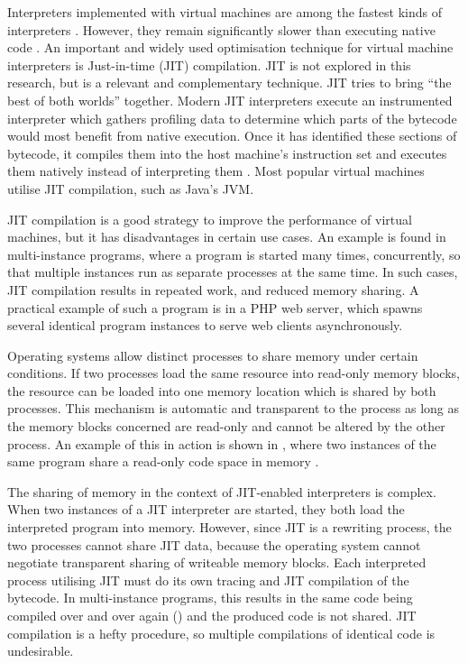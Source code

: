 		Interpreters implemented with virtual machines are among the fastest kinds of interpreters \citep{modernarchvm}. However, they remain significantly slower than executing native code \citep{optimizingindirectbranch}. An important and widely used optimisation technique for virtual machine interpreters is Just-in-time (JIT) compilation. JIT is not explored in this research, but is a relevant and complementary technique. JIT tries to bring ``the best of both worlds'' together. Modern JIT interpreters execute an instrumented interpreter which gathers profiling data to determine which parts of the bytecode would most benefit from native execution. Once it has identified these sections of bytecode, it compiles them into the host machine's instruction set and executes them natively instead of interpreting them \citep{historyjit}. Most popular virtual machines utilise JIT compilation, such as Java's JVM.
		
		JIT compilation is a good strategy to improve the performance of virtual machines, but it has disadvantages in certain use cases. An example is found in multi-instance programs, where a program is started many times, concurrently, so that multiple instances run as separate processes at the same time. In such cases, JIT compilation results in repeated work, and reduced memory sharing. A practical example of such a program is in a PHP web server, which spawns several identical program instances to serve web clients asynchronously.
		
		Operating systems allow distinct processes to share memory under certain conditions. If two processes load the same resource into read-only memory blocks, the resource can be loaded into one memory location which is shared by both processes. This mechanism is automatic and transparent to the process as long as the memory blocks concerned are read-only and cannot be altered by the other process. An example of this in action is shown in , where two instances of the same program share a read-only code space in memory \citep{sharedcodepatent}. 
		
		The sharing of memory in the context of JIT-enabled interpreters is complex. When two instances of a JIT interpreter are started, they both load the interpreted program into memory. However, since JIT is a rewriting process, the two processes cannot share JIT data, because the operating system cannot negotiate transparent sharing of writeable memory blocks. Each interpreted process utilising JIT must do its own tracing and JIT compilation of the bytecode. In multi-instance programs, this results in the same code being compiled over and over again () and the produced code is not shared. JIT compilation is a hefty procedure, so multiple compilations of identical code is undesirable. 
		
